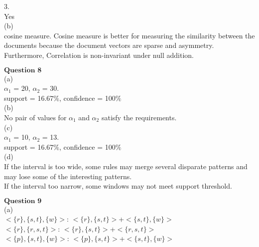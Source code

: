 \documentclass[12pt]{article}
\begin{document}
3.\\

Yes\\

(b)\\

cosine measure. Cosine measure is better for measuring the similarity between the documents because the document vectors are sparse and asymmetry. Furthermore, Correlation is non-invariant under null addition.\\

\newpage

$\textbf{Question 8}$ \\

(a)\\

$\alpha_1$ = 20, $\alpha_2$ = 30.\\

support = 16.67$\%$, confidence = 100$\%$\\

(b)\\

No pair of values for $\alpha_1$ and $\alpha_2$ satisfy the requirements.\\

(c)\\

$\alpha_1$ = 10, $\alpha_2$ = 13.\\

support = 16.67$\%$, confidence = 100$\%$\\

(d)\\

If the interval is too wide, some rules may merge several disparate patterns and may lose some of the interesting patterns.\\

If the interval too narrow, some windows may not meet support threshold.\\


\newpage

$\textbf{Question 9}$ \\

(a)\\

$<\{r\},\{s,t\},\{w\}>$: $<\{r\},\{s,t\}>$+$<\{s,t\},\{w\}>$\\

$<\{r\},\{r,s,t\}>$: $<\{r\},\{s,t\}>$+$<\{r,s,t\}>$\\

$<\{p\},\{s,t\},\{w\}>$: $<\{p\},\{s,t\}>$+$<\{s,t\},\{w\}>$\\
\end{document}
